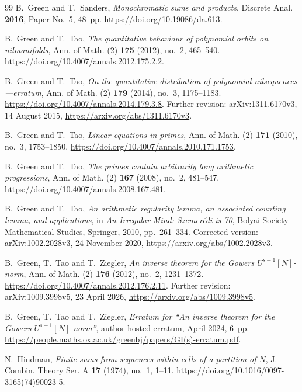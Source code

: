 \begin{thebibliography}{99}
B.~Green and T.~Sanders,
\emph{Monochromatic sums and products},
Discrete Anal. \textbf{2016}, Paper No.~5, 48~pp.
\url{https://doi.org/10.19086/da.613}.

B.~Green and T.~Tao,
\emph{The quantitative behaviour of polynomial orbits on nilmanifolds},
Ann. of Math. (2) \textbf{175} (2012), no.~2, 465--540.
\url{https://doi.org/10.4007/annals.2012.175.2.2}.

B.~Green and T.~Tao,
\emph{On the quantitative distribution of polynomial nilsequences---erratum},
Ann. of Math. (2) \textbf{179} (2014), no.~3, 1175--1183.
\url{https://doi.org/10.4007/annals.2014.179.3.8}.
Further revision: arXiv:1311.6170v3, 14 August 2015,
\url{https://arxiv.org/abs/1311.6170v3}.

B.~Green and T.~Tao,
\emph{Linear equations in primes},
Ann. of Math. (2) \textbf{171} (2010), no.~3, 1753--1850.
\url{https://doi.org/10.4007/annals.2010.171.1753}.

B.~Green and T.~Tao,
\emph{The primes contain arbitrarily long arithmetic progressions},
Ann. of Math. (2) \textbf{167} (2008), no.~2, 481--547.
\url{https://doi.org/10.4007/annals.2008.167.481}.

B.~Green and T.~Tao,
\emph{An arithmetic regularity lemma, an associated counting lemma, and applications},
in \emph{An Irregular Mind: Szemer\'edi is 70},
Bolyai Society Mathematical Studies, Springer, 2010, pp.~261--334.
Corrected version: arXiv:1002.2028v3, 24 November 2020,
\url{https://arxiv.org/abs/1002.2028v3}.

B.~Green, T.~Tao and T.~Ziegler,
\emph{An inverse theorem for the Gowers $U^{s+1}[N]$-norm},
Ann. of Math. (2) \textbf{176} (2012), no.~2, 1231--1372.
\url{https://doi.org/10.4007/annals.2012.176.2.11}.
Further revision: arXiv:1009.3998v5, 23 April 2026,
\url{https://arxiv.org/abs/1009.3998v5}.

B.~Green, T.~Tao and T.~Ziegler,
\emph{Erratum for ``An inverse theorem for the Gowers $U^{s+1}[N]$-norm''},
author-hosted erratum, April 2024, 6~pp.
\url{https://people.maths.ox.ac.uk/greenbj/papers/GI(s)-erratum.pdf}.

N.~Hindman,
\emph{Finite sums from sequences within cells of a partition of $N$},
J. Combin. Theory Ser. A \textbf{17} (1974), no.~1, 1--11.
\url{https://doi.org/10.1016/0097-3165(74)90023-5}.


\end{thebibliography}
